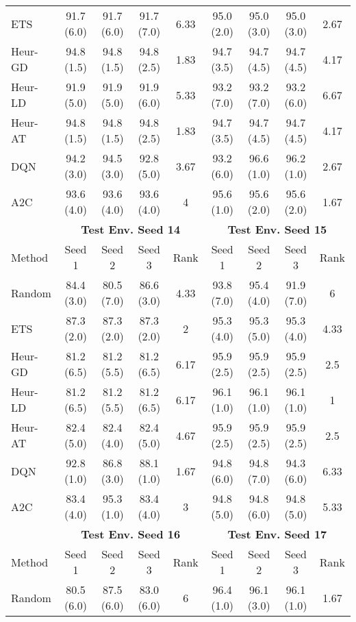 \begin{table}[t]
{\begin{tabular}{lcccccccc}
ETS        & 91.7 (6.0) & 91.7 (6.0) & 91.7 (7.0) & 6.33 & 95.0 (2.0) & 95.0 (3.0) & 95.0 (3.0) & 2.67 \\
Heur-GD & 94.8 (1.5) & 94.8 (1.5) & 94.8 (2.5) & 1.83 & 94.7 (3.5) & 94.7 (4.5) & 94.7 (4.5) & 4.17 \\
Heur-LD & 91.9 (5.0) & 91.9 (5.0) & 91.9 (6.0) & 5.33 & 93.2 (7.0) & 93.2 (7.0) & 93.2 (6.0) & 6.67 \\
Heur-AT & 94.8 (1.5) & 94.8 (1.5) & 94.8 (2.5) & 1.83 & 94.7 (3.5) & 94.7 (4.5) & 94.7 (4.5) & 4.17 \\
DQN        & 94.2 (3.0) & 94.5 (3.0) & 92.8 (5.0) & 3.67 & 93.2 (6.0) & 96.6 (1.0) & 96.2 (1.0) & 2.67 \\
A2C        & 93.6 (4.0) & 93.6 (4.0) & 93.6 (4.0) & 4    & 95.6 (1.0) & 95.6 (2.0) & 95.6 (2.0) & 1.67 \\ \midrule
    & \multicolumn{4}{c}{{\bf Test Env. Seed 14}}             & \multicolumn{4}{c}{{\bf Test Env. Seed 15}} \\
    \cmidrule(lr){2-5} \cmidrule(lr){6-9} 
Method     & Seed 1     & Seed 2     & Seed 3     & Rank & Seed 1     & Seed 2     & Seed 3     & Rank \\ \midrule
Random     & 84.4 (3.0) & 80.5 (7.0) & 86.6 (3.0) & 4.33 & 93.8 (7.0) & 95.4 (4.0) & 91.9 (7.0) & 6    \\
ETS        & 87.3 (2.0) & 87.3 (2.0) & 87.3 (2.0) & 2    & 95.3 (4.0) & 95.3 (5.0) & 95.3 (4.0) & 4.33 \\
Heur-GD & 81.2 (6.5) & 81.2 (5.5) & 81.2 (6.5) & 6.17 & 95.9 (2.5) & 95.9 (2.5) & 95.9 (2.5) & 2.5  \\
Heur-LD & 81.2 (6.5) & 81.2 (5.5) & 81.2 (6.5) & 6.17 & 96.1 (1.0) & 96.1 (1.0) & 96.1 (1.0) & 1    \\
Heur-AT & 82.4 (5.0) & 82.4 (4.0) & 82.4 (5.0) & 4.67 & 95.9 (2.5) & 95.9 (2.5) & 95.9 (2.5) & 2.5  \\
DQN        & 92.8 (1.0) & 86.8 (3.0) & 88.1 (1.0) & 1.67 & 94.8 (6.0) & 94.8 (7.0) & 94.3 (6.0) & 6.33 \\
A2C        & 83.4 (4.0) & 95.3 (1.0) & 83.4 (4.0) & 3    & 94.8 (5.0) & 94.8 (6.0) & 94.8 (5.0) & 5.33 \\ \midrule
    & \multicolumn{4}{c}{{\bf Test Env. Seed 16}}             & \multicolumn{4}{c}{{\bf Test Env. Seed 17}} \\ 
    \cmidrule(lr){2-5} \cmidrule(lr){6-9} 
Method     & Seed 1     & Seed 2     & Seed 3     & Rank & Seed 1     & Seed 2     & Seed 3     & Rank \\ \midrule
Random     & 80.5 (6.0) & 87.5 (6.0) & 83.0 (6.0) & 6    & 96.4 (1.0) & 96.1 (3.0) & 96.1 (1.0) & 1.67 \\

\end{tabular}}
\end{table}

